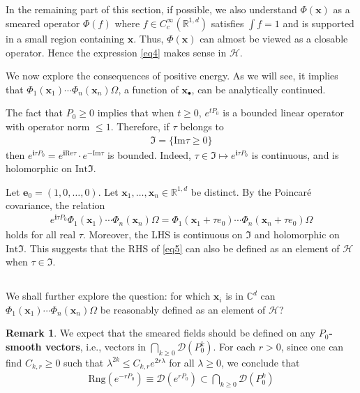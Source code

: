 \documentclass[12pt,b5paper,notitlepage]{article}
\theoremstyle{definition}
\newtheorem{rem}[df]{Remark}
\theoremstyle{plain}
\newcommand{\fk}{\mathfrak}
\newcommand{\mc}{\mathcal}
\newcommand{\Dom}{\scr{D}}
\newcommand{\scr}{\mathscr}
\newcommand{\im}{\mathbf{i}}
\newcommand{\mbf}{\mathbf}
\newcommand{\blt}{\bullet}
\newcommand{\Cbb}{\mathbb C}
\newcommand{\Rbb}{\mathbb R}
\newcommand{\Rng}{\mathrm{Rng}}
\newcommand{\Real}{\mathrm{Re}}
\newcommand{\Imag}{\mathrm{Im}}
\newcommand{\Int}{\mathrm{Int}}
\newcommand{\xbf}{\mathbf x}
\numberwithin{equation}{section}
\begin{document}
\subsection{}

In the remaining part of this section,  if possible, we also understand $\Phi(\xbf)$ as a smeared operator $\Phi(f)$ where $f\in C_c^\infty(\Rbb^{1,d})$ satisfies $\int f=1$ and is supported in a small region containing $\xbf$. Thus, $\Phi(\xbf)$ can almost be viewed as a closable operator. Hence the expression \eqref{eq4} makes sense in $\mc H$.


We now explore the consequences of positive energy. As we will see, it implies that $\Phi_1(\xbf_1)\cdots\Phi_n(\xbf_n)\Omega$, a function of $\xbf_\blt$, can be analytically continued.

The fact that $P_0\geq0$ implies that when $t\geq0$, $e^{tP_0}$ is a bounded linear operator with operator norm $\leq1$. Therefore, if $\tau$ belongs to
\begin{align*}
\fk I=\{\Imag\tau\geq0\}
\end{align*}
then $e^{\im \tau P_0}=e^{\im \Real\tau}\cdot e^{-\Imag\tau}$ is bounded. Indeed, $\tau\in\fk I\mapsto e^{\im\tau P_0}$ is continuous, and is holomorphic on $\Int\fk I$. 

Let $\mbf e_0=(1,0,\dots,0)$. Let $\xbf_1,\dots,\xbf_n\in\Rbb^{1,d}$ be distinct. By the Poincar\'e covariance, the relation
\begin{align}\label{eq5}
e^{\im\tau P_0}\Phi_1(\xbf_1)\cdots\Phi_n(\xbf_n)\Omega=\Phi_1(\xbf_1+\tau e_0)\cdots\Phi_n(\xbf_n+\tau e_0)\Omega
\end{align}
holds for all real $\tau$. Moreover, the LHS is continuous on $\fk I$ and holomorphic on $\Int\fk I$. This suggests that the RHS of \eqref{eq5} can also be defined as an element of $\mc H$ when $\tau\in\fk I$. 


\subsection{}\label{lb3}


We shall further explore the question: for which $\xbf_i$ is in $\Cbb^d$ can $\Phi_1(\xbf_1)\cdots\Phi_n(\xbf_n)\Omega$ be reasonably defined as an element of $\mc H$? 

\begin{rem}
We expect that the smeared fields should be defined on any \textbf{$P_0$-smooth vectors}, i.e., vectors in $\bigcap_{k\geq0}\Dom(P_0^k)$. For each $r>0$, since one can find $C_{k,r}\geq0$ such that $\lambda^{2k}\leq C_{k,r}e^{2r\lambda}$ for all $\lambda\geq0$, we conclude that
\begin{align}
\Rng(e^{-rP_0})\equiv \Dom(e^{rP_0})\subset \bigcap_{k\geq0}\Dom(P_0^k)
\end{align}
\end{rem}
\end{document}
